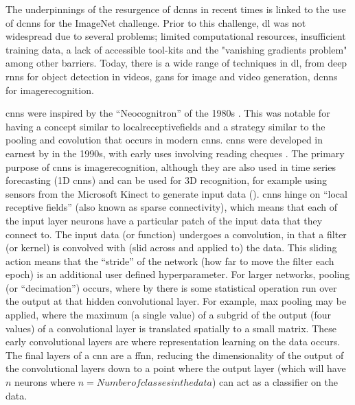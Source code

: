 The underpinnings of the resurgence of \gls{dcnn}s in recent times is linked to the use of \gls{dcnn}s for the ImageNet challenge. Prior to this challenge, \gls{dl} was not widespread due to several problems; limited computational resources, insufficient training data, a lack of accessible tool-kits and the  "vanishing gradients problem" \cite[Chapter~8]{good_fellow_2016} \cite[p.~93-94]{dl_overview} among other barriers. Today, there is a wide range of techniques in \gls{dl}, from deep \gls{rnn}s for object detection in videos, \gls{gan}s for image and video generation, \gls{dcnn}s for \gls{imagerecognition}.

 \gls{cnn}s were inspired by the \enquote{Neocognitron} of the 1980s \cite{neocognitron_proposal} \cite{neocognitron}. This was notable for having a concept similar to \gls{localreceptivefields} and a strategy similar to the pooling and covolution that occurs in modern \gls{cnn}s. \gls{cnn}s were developed in earnest by in the 1990s, with early uses involving reading cheques \cite{LeNet}. The primary purpose of \gls{cnn}s is \gls{imagerecognition}, although they are also used in time series forecasting (1D \gls{cnn}s) and can be used for 3D recognition, for example using sensors from the Microsoft Kinect to generate input data (\cite{3d_conv}). \gls{cnn}s hinge on \enquote{local receptive fields} (also known as sparse connectivity), which means that each of the input layer neurons have a particular patch of the input data that they connect to. The input data (or function) undergoes a convolution, in that a filter (or kernel) is convolved with (slid across and applied to) the data. This sliding action means that the \enquote{stride} of the network (how far to move the filter each epoch) is an additional user defined hyperparameter. For larger networks, pooling (or \enquote{decimation}) occurs, where by there is some statistical operation run over the output at that hidden convolutional layer. For example, max pooling may be applied, where the maximum (a single value) of a subgrid of the output (four values) of a convolutional layer is translated spatially to a small matrix. These early convolutional layers are where representation learning on the data occurs. The final layers of a \gls{cnn} are a \gls{ffnn}, reducing the dimensionality of the output of the convolutional layers down to a point where the output layer (which will have $n$ neurons where $n = Number of classes in the data$) can act as a classifier on the data.

